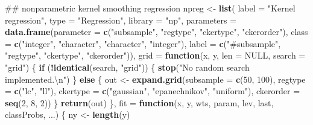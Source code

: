 \documentclass[]{article}
\newenvironment{Shaded}{\begin{snugshade}}{\end{snugshade}}
\newcommand{\CharTok}[1]{\textcolor[rgb]{0.31,0.60,0.02}{#1}}
\newcommand{\ControlFlowTok}[1]{\textcolor[rgb]{0.13,0.29,0.53}{\textbf{#1}}}
\newcommand{\DataTypeTok}[1]{\textcolor[rgb]{0.13,0.29,0.53}{#1}}
\newcommand{\DecValTok}[1]{\textcolor[rgb]{0.00,0.00,0.81}{#1}}
\newcommand{\KeywordTok}[1]{\textcolor[rgb]{0.13,0.29,0.53}{\textbf{#1}}}
\newcommand{\NormalTok}[1]{#1}
\newcommand{\OperatorTok}[1]{\textcolor[rgb]{0.81,0.36,0.00}{\textbf{#1}}}
\newcommand{\OtherTok}[1]{\textcolor[rgb]{0.56,0.35,0.01}{#1}}
\newcommand{\StringTok}[1]{\textcolor[rgb]{0.31,0.60,0.02}{#1}}
\theoremstyle{definition}
\theoremstyle{definition}
\theoremstyle{definition}
\theoremstyle{remark}
\begin{document}
\begin{Shaded}
\begin{Highlighting}[]
\NormalTok{## nonparametric kernel smoothing regression}
\NormalTok{npreg <-}\StringTok{ }\KeywordTok{list}\NormalTok{(}
  \DataTypeTok{label =} \StringTok{"Kernel regression"}\NormalTok{,}
  \DataTypeTok{type =} \StringTok{"Regression"}\NormalTok{,}
  \DataTypeTok{library =} \StringTok{"np"}\NormalTok{,}
  \DataTypeTok{parameters =} \KeywordTok{data.frame}\NormalTok{(}\DataTypeTok{parameter =}
                            \KeywordTok{c}\NormalTok{(}\StringTok{"subsample"}\NormalTok{, }\StringTok{"regtype"}\NormalTok{,}
                              \StringTok{"ckertype"}\NormalTok{, }\StringTok{"ckerorder"}\NormalTok{), }
                          \DataTypeTok{class =} \KeywordTok{c}\NormalTok{(}\StringTok{"integer"}\NormalTok{, }\StringTok{"character"}\NormalTok{,}
                                    \StringTok{"character"}\NormalTok{, }\StringTok{"integer"}\NormalTok{), }
                          \DataTypeTok{label =} \KeywordTok{c}\NormalTok{(}\StringTok{"#subsample"}\NormalTok{, }\StringTok{"regtype"}\NormalTok{,}
                                    \StringTok{"ckertype"}\NormalTok{, }\StringTok{"ckerorder"}\NormalTok{)),}
  \DataTypeTok{grid =} \ControlFlowTok{function}\NormalTok{(x, y, }\DataTypeTok{len =} \OtherTok{NULL}\NormalTok{, }\DataTypeTok{search =} \StringTok{"grid"}\NormalTok{) \{}
    \ControlFlowTok{if}\NormalTok{ (}\OperatorTok{!}\KeywordTok{identical}\NormalTok{(search, }\StringTok{"grid"}\NormalTok{)) \{}
      \KeywordTok{stop}\NormalTok{(}\StringTok{"No random search implemented.}\CharTok{\textbackslash{}n}\StringTok{"}\NormalTok{)}
\NormalTok{    \} }\ControlFlowTok{else}\NormalTok{ \{}
\NormalTok{      out <-}\StringTok{ }\KeywordTok{expand.grid}\NormalTok{(}\DataTypeTok{subsample =} \KeywordTok{c}\NormalTok{(}\DecValTok{50}\NormalTok{, }\DecValTok{100}\NormalTok{),}
                         \DataTypeTok{regtype =} \KeywordTok{c}\NormalTok{(}\StringTok{"lc"}\NormalTok{, }\StringTok{"ll"}\NormalTok{),}
                         \DataTypeTok{ckertype =}
                           \KeywordTok{c}\NormalTok{(}\StringTok{"gaussian"}\NormalTok{,}
                             \StringTok{"epanechnikov"}\NormalTok{,}
                             \StringTok{"uniform"}\NormalTok{),}
                         \DataTypeTok{ckerorder =} \KeywordTok{seq}\NormalTok{(}\DecValTok{2}\NormalTok{, }\DecValTok{8}\NormalTok{, }\DecValTok{2}\NormalTok{))}
\NormalTok{    \} }
    \KeywordTok{return}\NormalTok{(out)}
\NormalTok{  \},}
  \DataTypeTok{fit =} \ControlFlowTok{function}\NormalTok{(x, y, wts, param, lev, last, classProbs, ...) \{}
\NormalTok{    ny <-}\StringTok{ }\KeywordTok{length}\NormalTok{(y)}

\end{Highlighting}
\end{Shaded}
\end{document}
